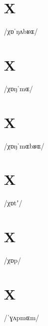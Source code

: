 \documentclass[10pt,a4paper,twoside]{book}
\begin{document}
\section*{X}

\begin{multicols}{3}
 {/χɒˈŋʌbʁɶ/} {}
\end{multicols}

\section*{X}

\begin{multicols}{3}
 {/χɒŋˈmɶ/} {}
\end{multicols}

\section*{X}

\begin{multicols}{3}
 {/χɒŋˈmɶbʁɶ/} {}
\end{multicols}

\section*{X}

\begin{multicols}{3}
 {/χɒtʼ/} {}
\end{multicols}

\section*{X}

\begin{multicols}{3}
 {/χɒp/} {}
\end{multicols}

\section*{X}

\begin{multicols}{3}
 {/ˈɣʌpmɶm/} {}
\end{multicols}
\end{document}

